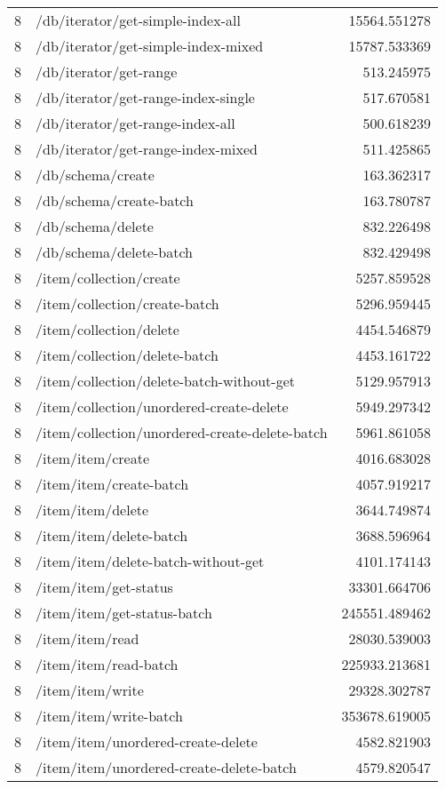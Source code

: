 \begin{longtable}{rlr}
8 & /db/iterator/get-simple-index-all & 15564.551278 \\
8 & /db/iterator/get-simple-index-mixed & 15787.533369 \\
8 & /db/iterator/get-range & 513.245975 \\
8 & /db/iterator/get-range-index-single & 517.670581 \\
8 & /db/iterator/get-range-index-all & 500.618239 \\
8 & /db/iterator/get-range-index-mixed & 511.425865 \\
8 & /db/schema/create & 163.362317 \\
8 & /db/schema/create-batch & 163.780787 \\
8 & /db/schema/delete & 832.226498 \\
8 & /db/schema/delete-batch & 832.429498 \\
8 & /item/collection/create & 5257.859528 \\
8 & /item/collection/create-batch & 5296.959445 \\
8 & /item/collection/delete & 4454.546879 \\
8 & /item/collection/delete-batch & 4453.161722 \\
8 & /item/collection/delete-batch-without-get & 5129.957913 \\
8 & /item/collection/unordered-create-delete & 5949.297342 \\
8 & /item/collection/unordered-create-delete-batch & 5961.861058 \\
8 & /item/item/create & 4016.683028 \\
8 & /item/item/create-batch & 4057.919217 \\
8 & /item/item/delete & 3644.749874 \\
8 & /item/item/delete-batch & 3688.596964 \\
8 & /item/item/delete-batch-without-get & 4101.174143 \\
8 & /item/item/get-status & 33301.664706 \\
8 & /item/item/get-status-batch & 245551.489462 \\
8 & /item/item/read & 28030.539003 \\
8 & /item/item/read-batch & 225933.213681 \\
8 & /item/item/write & 29328.302787 \\
8 & /item/item/write-batch & 353678.619005 \\
8 & /item/item/unordered-create-delete & 4582.821903 \\
8 & /item/item/unordered-create-delete-batch & 4579.820547 \\

\end{longtable}
